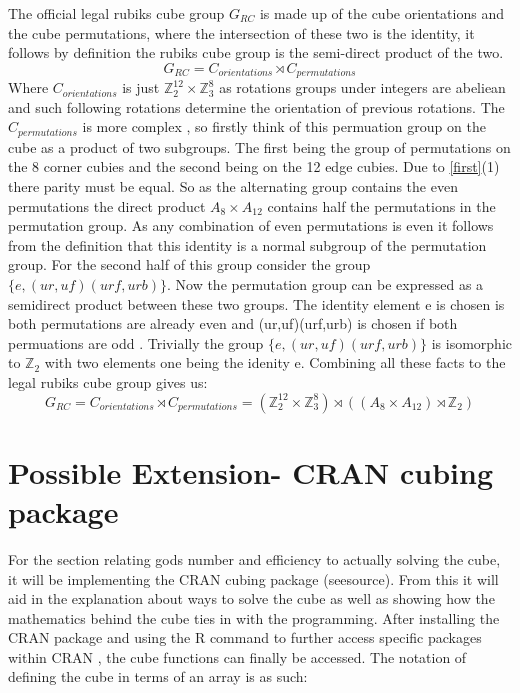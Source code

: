 \documentclass{article}
\begin{document}
The official legal rubiks cube group $G_{RC}$ is made up of the cube orientations and the cube permutations, where the intersection of these two is the identity, it follows by definition the rubiks cube group is the semi-direct product of the two. 
\begin{equation}
G_{RC} = C_{orientations} \rtimes C_{permutations}
\end{equation}
Where $C_{orientations}$ is just $\mathbb{Z}_{2}^{12} \times \mathbb{Z}_{3}^{8}$ as rotations groups under integers are abeliean and such following rotations determine the orientation of previous rotations. 
The $C_{permutations}$ is more complex , so firstly think of this permuation group on the cube as a product of two subgroups. The first being the group of permutations on the 8 corner cubies and the second being on the 12 edge cubies. Due to \ref{first}(1) there parity must be equal. So as the alternating group contains the even permutations the direct product $A_8 \times A_{12}$ contains half the permutations in the permutation group. As any combination of even permutations is even it follows from the definition that this identity is a normal subgroup of the permutation group.
For the second half of this group consider the group $\{e,(ur,uf)(urf,urb)\}$. Now the permutation group can be expressed as a semidirect product between these two groups. The identity element e is chosen is both permutations are already even and (ur,uf)(urf,urb) is chosen if both permuations are odd \cite{final}. Trivially the group $\{e,(ur,uf)(urf,urb)\}$ is isomorphic to $\mathbb{Z}_2$ with two elements one being the idenity e. Combining all these facts to the legal rubiks cube group gives us: 
\begin{equation}
G_{RC} = C_{orientations} \rtimes C_{permutations} = (\mathbb{Z}_{2}^{12} \times \mathbb{Z}_{3}^{8}) \rtimes ((A_8 \times A_{12})\rtimes \mathbb{Z}_2)
\end{equation} 


\newpage
\section{Possible Extension- CRAN cubing package}

For the section relating gods number and efficiency to actually solving the cube, it will be implementing the CRAN cubing package (seesource). From this it will
aid in the explanation about ways to solve the cube as well as showing how the mathematics behind the cube ties in with the programming.
After installing the CRAN package and using the R command to further access specific packages within CRAN , the cube functions can finally be accessed. The notation of defining the cube in terms of an array is as such:
\end{document}
